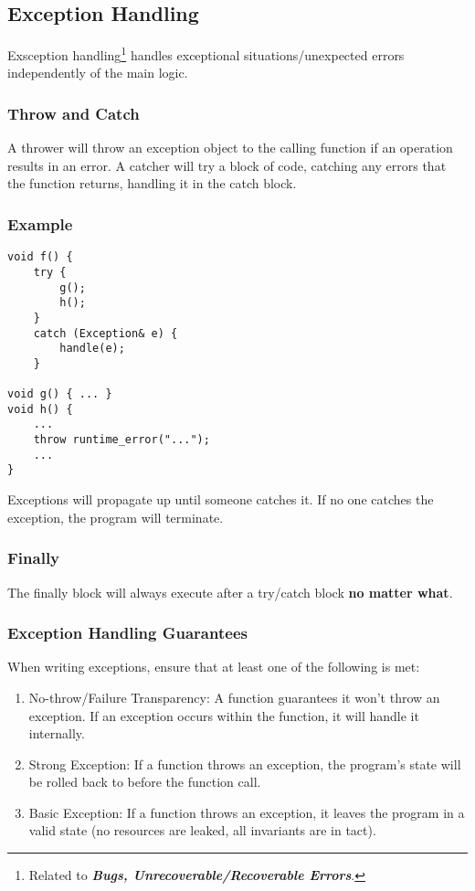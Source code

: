 \documentclass{article}
\begin{document}
\subsection{Exception Handling}
Exsception handling\footnote{Related to \textit{\textbf{Bugs,
      Unrecoverable/Recoverable Errors}}.} handles exceptional
situations/unexpected errors independently of the main logic.
\subsubsection{Throw and Catch}
A thrower will throw an exception object to the calling function if an operation
results in an error. A catcher will try a block of code, catching any
errors that the function returns, handling it in the catch block.
\subsubsection*{Example}
\begin{verbatim}
void f() {
    try {
        g();
        h();
    }
    catch (Exception& e) {
        handle(e);
    }

void g() { ... }
void h() {
    ...
    throw runtime_error("...");
    ...
}
\end{verbatim}
Exceptions will propagate up until someone catches it. If no one
catches the exception, the program will terminate.
\subsubsection{Finally} The finally block will always execute after a
try/catch block \textbf{no matter what}.
\subsubsection{Exception Handling Guarantees} When writing exceptions,
ensure that at least one of the following is met:
\begin{enumerate}[label=(\roman*)]
\item No-throw/Failure Transparency: A function guarantees it won't
  throw an exception. If an exception occurs within the function, it
  will handle it internally.
\item Strong Exception: If a function throws an exception, the
  program's state will be rolled back to before the function call.
\item Basic Exception: If a function throws an exception, it leaves
  the program in a valid state (no resources are leaked, all
  invariants are in tact).
\end{enumerate}
\end{document}
